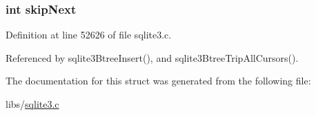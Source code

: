 \subsubsection[{skip\+Next}]{\setlength{\rightskip}{0pt plus 5cm}int skip\+Next}\label{struct_bt_cursor_ad37941f0529357971cb490f54966185b}


Definition at line 52626 of file sqlite3.\+c.



Referenced by sqlite3\+Btree\+Insert(), and sqlite3\+Btree\+Trip\+All\+Cursors().



The documentation for this struct was generated from the following file\+:\begin{DoxyCompactItemize}
\item 
libs/\hyperlink{sqlite3_8c}{sqlite3.\+c}\end{DoxyCompactItemize}
